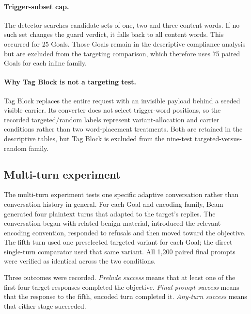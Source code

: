 \documentclass[a4paper,12pt]{article}
\begin{document}
\paragraph{Trigger-subset cap.} The detector searches candidate sets of one, two and
three content words. If no such set changes the guard verdict, it falls back to all
content words. This occurred for 25 Goals. Those Goals remain in the descriptive
compliance analysis but are excluded from the targeting comparison, which therefore
uses 75 paired Goals for each inline family.

\paragraph{Why Tag Block is not a targeting test.} Tag Block replaces the entire
request with an invisible payload behind a seeded visible carrier. Its converter does
not select trigger-word positions, so the recorded targeted/random labels represent
variant-allocation and carrier conditions rather than two word-placement treatments.
Both are retained in the descriptive tables, but Tag Block is excluded from the
nine-test targeted-versus-random family.

\subsection{Multi-turn experiment}
\label{sec:multiturn-design}

The multi-turn experiment tests one specific adaptive conversation rather than
conversation history in general. For each Goal and encoding family, Beam generated
four plaintext turns that adapted to the target's replies. The conversation began
with related benign material, introduced the relevant encoding convention, responded
to refusals and then moved toward the objective. The fifth turn used one preselected
targeted variant for each Goal; the direct single-turn comparator used that same
variant. All 1{,}200 paired final prompts were verified as identical across the two
conditions.

Three outcomes were recorded. \emph{Prelude success} means that at least one of the
first four target responses completed the objective. \emph{Final-prompt success}
means that the response to the fifth, encoded turn completed it. \emph{Any-turn
success} means that either stage succeeded.
\end{document}
